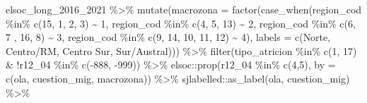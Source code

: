 \documentclass[
  12pt,
]{book}
\newenvironment{Shaded}{\begin{snugshade}}{\end{snugshade}}
\newcommand{\AttributeTok}[1]{\textcolor[rgb]{0.77,0.63,0.00}{#1}}
\newcommand{\DecValTok}[1]{\textcolor[rgb]{0.00,0.00,0.81}{#1}}
\newcommand{\FunctionTok}[1]{\textcolor[rgb]{0.00,0.00,0.00}{#1}}
\newcommand{\NormalTok}[1]{#1}
\newcommand{\SpecialCharTok}[1]{\textcolor[rgb]{0.00,0.00,0.00}{#1}}
\newcommand{\StringTok}[1]{\textcolor[rgb]{0.31,0.60,0.02}{#1}}
\begin{document}
\begin{Shaded}
\begin{Highlighting}[]
\NormalTok{elsoc\_long\_2016\_2021 }\SpecialCharTok{\%\textgreater{}\%} 
  \FunctionTok{mutate}\NormalTok{(}\AttributeTok{macrozona =} \FunctionTok{factor}\NormalTok{(}\FunctionTok{case\_when}\NormalTok{(region\_cod }\SpecialCharTok{\%in\%} \FunctionTok{c}\NormalTok{(}\DecValTok{15}\NormalTok{, }\DecValTok{1}\NormalTok{, }\DecValTok{2}\NormalTok{, }\DecValTok{3}\NormalTok{) }\SpecialCharTok{\textasciitilde{}} \DecValTok{1}\NormalTok{,}
\NormalTok{                               region\_cod }\SpecialCharTok{\%in\%} \FunctionTok{c}\NormalTok{(}\DecValTok{4}\NormalTok{, }\DecValTok{5}\NormalTok{, }\DecValTok{13}\NormalTok{) }\SpecialCharTok{\textasciitilde{}} \DecValTok{2}\NormalTok{,}
\NormalTok{                               region\_cod }\SpecialCharTok{\%in\%} \FunctionTok{c}\NormalTok{(}\DecValTok{6}\NormalTok{, }\DecValTok{7}\NormalTok{ , }\DecValTok{16}\NormalTok{, }\DecValTok{8}\NormalTok{) }\SpecialCharTok{\textasciitilde{}} \DecValTok{3}\NormalTok{,}
\NormalTok{                               region\_cod }\SpecialCharTok{\%in\%} \FunctionTok{c}\NormalTok{(}\DecValTok{9}\NormalTok{, }\DecValTok{14}\NormalTok{, }\DecValTok{10}\NormalTok{, }\DecValTok{11}\NormalTok{, }\DecValTok{12}\NormalTok{) }\SpecialCharTok{\textasciitilde{}} \DecValTok{4}\NormalTok{),}
                            \AttributeTok{labels =} \FunctionTok{c}\NormalTok{(}\StringTok{\textquotesingle{}Norte\textquotesingle{}}\NormalTok{, }\StringTok{\textquotesingle{}Centro/RM\textquotesingle{}}\NormalTok{, }\StringTok{\textquotesingle{}Centro Sur\textquotesingle{}}\NormalTok{, }\StringTok{\textquotesingle{}Sur/Austral\textquotesingle{}}\NormalTok{))) }\SpecialCharTok{\%\textgreater{}\%} 
  \FunctionTok{filter}\NormalTok{(tipo\_atricion }\SpecialCharTok{\%in\%} \FunctionTok{c}\NormalTok{(}\DecValTok{1}\NormalTok{, }\DecValTok{17}\NormalTok{) }\SpecialCharTok{\&} \SpecialCharTok{!}\NormalTok{r12\_04 }\SpecialCharTok{\%in\%} \FunctionTok{c}\NormalTok{(}\SpecialCharTok{{-}}\DecValTok{888}\NormalTok{, }\SpecialCharTok{{-}}\DecValTok{999}\NormalTok{)) }\SpecialCharTok{\%\textgreater{}\%} 
\NormalTok{  elsoc}\SpecialCharTok{::}\FunctionTok{prop}\NormalTok{(r12\_04 }\SpecialCharTok{\%in\%} \FunctionTok{c}\NormalTok{(}\DecValTok{4}\NormalTok{,}\DecValTok{5}\NormalTok{), }\AttributeTok{by =} \FunctionTok{c}\NormalTok{(ola, cuestion\_mig, macrozona)) }\SpecialCharTok{\%\textgreater{}\%} 
\NormalTok{  sjlabelled}\SpecialCharTok{::}\FunctionTok{as\_label}\NormalTok{(ola, cuestion\_mig) }\SpecialCharTok{\%\textgreater{}\%} 

\end{Highlighting}
\end{Shaded}
\end{document}
